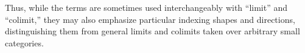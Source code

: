 \begin{definition}
Thus, while the terms are sometimes used interchangeably with ``limit'' and ``colimit,'' they may also emphasize particular indexing shapes and directions, distinguishing them from general limits and colimits taken over arbitrary small categories.
\end{definition}